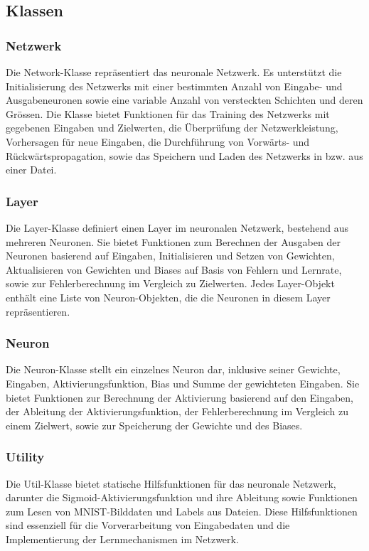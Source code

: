 \subsection{Klassen}
\label{sec:RealKlassen}
\subsubsection{Netzwerk}
\label{sec:RealNetzwerk}
Die Network-Klasse repräsentiert das neuronale Netzwerk. Es unterstützt die Initialisierung des Netzwerks mit einer bestimmten Anzahl von Eingabe- und Ausgabeneuronen sowie eine variable Anzahl von versteckten Schichten und deren Grössen. Die Klasse bietet Funktionen für das Training des Netzwerks mit gegebenen Eingaben und Zielwerten, die Überprüfung der Netzwerkleistung, Vorhersagen für neue Eingaben, die Durchführung von Vorwärts- und Rückwärtspropagation, sowie das Speichern und Laden des Netzwerks in bzw. aus einer Datei. 
\subsubsection{Layer}
\label{sec:RealLayer}
Die Layer-Klasse definiert einen Layer im neuronalen Netzwerk, bestehend aus mehreren Neuronen. Sie bietet Funktionen zum Berechnen der Ausgaben der Neuronen basierend auf Eingaben, Initialisieren und Setzen von Gewichten, Aktualisieren von Gewichten und Biases auf Basis von Fehlern und Lernrate, sowie zur Fehlerberechnung im Vergleich zu Zielwerten. Jedes Layer-Objekt enthält eine Liste von Neuron-Objekten, die die Neuronen in diesem Layer repräsentieren. 
\subsubsection{Neuron}
\label{sec:RealNeuron}
Die Neuron-Klasse stellt ein einzelnes Neuron dar, inklusive seiner Gewichte, Eingaben, Aktivierungsfunktion, Bias und Summe der gewichteten Eingaben. Sie bietet Funktionen zur Berechnung der Aktivierung basierend auf den Eingaben, der Ableitung der Aktivierungsfunktion, der Fehlerberechnung im Vergleich zu einem Zielwert, sowie zur Speicherung der Gewichte und des Biases. 
\subsubsection{Utility}
\label{sec:RealUtility}
Die Util-Klasse bietet statische Hilfsfunktionen für das neuronale Netzwerk, darunter die Sigmoid-Aktivierungsfunktion und ihre Ableitung sowie Funktionen zum Lesen von MNIST-Bilddaten und Labels aus Dateien. Diese Hilfsfunktionen sind essenziell für die Vorverarbeitung von Eingabedaten und die Implementierung der Lernmechanismen im Netzwerk. 
